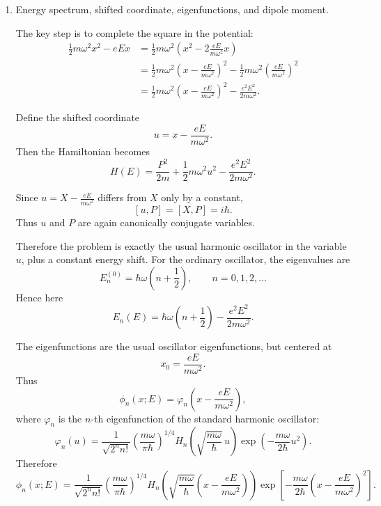 \documentclass[11pt,a4paper]{scrartcl}
\begin{document}
\begin{enumerate}[label=(\alph*)]
    \item Energy spectrum, shifted coordinate, eigenfunctions, and dipole moment.

    \begin{calculationbox}
    The key step is to complete the square in the potential:
    \begin{align*}
        \frac12 m\omega^2 x^2 - eEx
        &= \frac12 m\omega^2\left(x^2 - 2\frac{eE}{m\omega^2}x\right) \\
        &= \frac12 m\omega^2\left(x-\frac{eE}{m\omega^2}\right)^2
           - \frac12 m\omega^2\left(\frac{eE}{m\omega^2}\right)^2 \\
        &= \frac12 m\omega^2\left(x-\frac{eE}{m\omega^2}\right)^2
           - \frac{e^2E^2}{2m\omega^2}.
    \end{align*}

    Define the shifted coordinate
    \[
    u=x-\frac{eE}{m\omega^2}.
    \]
    Then the Hamiltonian becomes
    \[
    H(E)=\frac{P^2}{2m}+\frac12 m\omega^2 u^2-\frac{e^2E^2}{2m\omega^2}.
    \]

    Since $u=X-\frac{eE}{m\omega^2}$ differs from $X$ only by a constant,
    \[
    [u,P]=[X,P]=i\hbar.
    \]
    Thus $u$ and $P$ are again canonically conjugate variables.

    Therefore the problem is exactly the usual harmonic oscillator in the variable $u$, plus a constant energy shift.
    For the ordinary oscillator, the eigenvalues are
    \[
    E_n^{(0)}=\hbar\omega\left(n+\frac12\right), \qquad n=0,1,2,\dots
    \]
    Hence here
    \[
    \boxed{
    E_n(E)=\hbar\omega\left(n+\frac12\right)-\frac{e^2E^2}{2m\omega^2}
    }.
    \]

    The eigenfunctions are the usual oscillator eigenfunctions, but centered at
    \[
    x_0=\frac{eE}{m\omega^2}.
    \]
    Thus
    \[
    \phi_n(x;E)=\varphi_n\!\left(x-\frac{eE}{m\omega^2}\right),
    \]
    where $\varphi_n$ is the $n$-th eigenfunction of the standard harmonic oscillator:
    \[
    \varphi_n(u)=
    \frac{1}{\sqrt{2^n n!}}
    \left(\frac{m\omega}{\pi\hbar}\right)^{1/4}
    H_n\!\left(\sqrt{\frac{m\omega}{\hbar}}\,u\right)
    \exp\!\left(-\frac{m\omega}{2\hbar}u^2\right).
    \]
    Therefore
    \[
    \boxed{
    \phi_n(x;E)=
    \frac{1}{\sqrt{2^n n!}}
    \left(\frac{m\omega}{\pi\hbar}\right)^{1/4}
    H_n\!\left(\sqrt{\frac{m\omega}{\hbar}}\left(x-\frac{eE}{m\omega^2}\right)\right)
    \exp\!\left[-\frac{m\omega}{2\hbar}\left(x-\frac{eE}{m\omega^2}\right)^2\right]
    }.
    \]


\end{calculationbox}
\end{enumerate}
\end{document}
